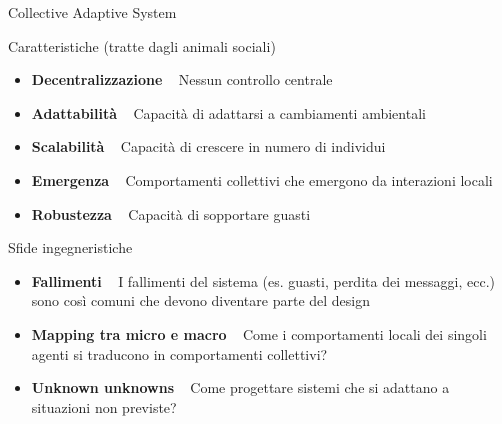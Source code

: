 \documentclass[presentation, 10pt,aspectratio=169]{beamer}\mode<presentation>{\usetheme{AMSBolognaFC}}
\begin{document}
\begin{frame}{Collective Adaptive System}
\begin{alertblock}{Caratteristiche (tratte dagli animali sociali)}
	\begin{itemize}
		\item \textbf{Decentralizzazione} \faArrowRight ~ Nessun controllo centrale
		\item \textbf{Adattabilità} \faArrowRight ~ Capacità di adattarsi a cambiamenti ambientali
		\item \textbf{Scalabilità} \faArrowRight ~ Capacità di crescere in numero di individui 
		\item \textbf{Emergenza} \faArrowRight ~ Comportamenti collettivi che emergono da interazioni locali
		\item \textbf{Robustezza} \faArrowRight ~ Capacità di sopportare guasti
	\end{itemize}	
\end{alertblock}

\begin{exampleblock}{Sfide ingegneristiche}
	\begin{itemize}
		\item \textbf{Fallimenti} \faArrowRight ~ I fallimenti del sistema (es. guasti, perdita dei messaggi, ecc.) sono così comuni che devono diventare parte del design
		\item \textbf{Mapping tra micro e macro} \faArrowRight ~ Come i comportamenti locali dei singoli agenti si traducono in comportamenti collettivi?
		\item \textbf{Unknown unknowns} \faArrowRight ~ Come progettare sistemi che si adattano a situazioni non previste?
	\end{itemize}
\end{exampleblock}
\end{frame}
\end{document}
